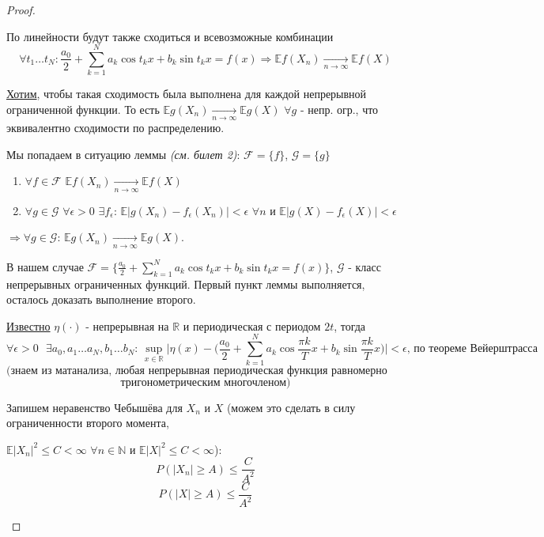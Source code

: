 \begin{proof}
\begin{itemize}
        По линейности будут также сходиться и всевозможные комбинации $$ \forall t_1 \ldots t_N: \frac{a_0}{2} + \sum_{k = 1}^{N} a_k\cos{t_kx} + b_k\sin{t_kx} = f(x) \Rightarrow \mathbb{E}f(X_n) \xrightarrow[n \rightarrow \infty]{} \mathbb{E}f(X) $$
        
        \underline{Хотим}, чтобы такая сходимость была выполнена для каждой непрерывной ограниченной функции. То есть $\mathbb{E}g(X_n) \xrightarrow[n \rightarrow \infty]{} \mathbb{E}g(X)$ $\forall g$ - непр. огр., что эквивалентно сходимости по распределению.
        
        Мы попадаем в ситуацию леммы \textit{(см. билет 2)}: $\mathcal{F} = \{f\}$, $\mathcal{G} = \{g\}$
        \begin{enumerate}
            \item $\forall f \in \mathcal{F}$ $\mathbb{E}f(X_n) \xrightarrow[n \rightarrow \infty]{} \mathbb{E}f(X)$
            \item $\forall g \in \mathcal{G}$ $\forall \epsilon > 0$ $\exists f_{\epsilon}$: $\mathbb{E}|g(X_n) - f_{\epsilon}(X_n)| < \epsilon$ $\forall n$ и $\mathbb{E}|g(X) - f_{\epsilon}(X)| < \epsilon$
        \end{enumerate}
        $\Rightarrow \forall g \in \mathcal{G}$: $\mathbb{E}g(X_n) \xrightarrow[n \rightarrow \infty]{} \mathbb{E}g(X)$.
        
        В нашем случае $\mathcal{F} = \Big\{ \frac{a_0}{2} + \sum_{k = 1}^{N} a_k\cos{t_kx} + b_k\sin{t_kx} = f(x) \Big\}$, $\mathcal{G}$ - класс непрерывных ограниченных функций. Первый пункт леммы выполняется, осталось доказать выполнение второго.
        
        \underline{Известно} $\eta(\cdot)$ - непрерывная на $\mathbb{R}$ и периодическая с периодом $2t$, тогда $$ \forall \epsilon > 0 \textrm{ } \exists a_0, a_1 \ldots a_N, b_1 \ldots b_N \textrm{: } \sup_{x \in \mathbb{R}}\Big|\eta(x) - \Big(\frac{a_0}{2} + \sum_{k = 1}^{N}a_k\cos{\frac{\pi k}{T}x} + b_k\sin{\frac{\pi k}{T}x} \Big) \Big| < \epsilon \textrm{, по теореме Вейерштрасса}$$ $$ \textrm{(знаем из матанализа, любая непрерывная периодическая функция равномерно приближается } $$ $$ \textrm{тригонометрическим многочленом)} $$
        
        Запишем неравенство Чебышёва для $X_n$ и $X$ (можем это сделать в силу ограниченности второго момента,
        
        $\mathbb{E}|X_n|^2 \leq C < \infty$ $\forall n \in \mathbb{N}$ и $\mathbb{E}|X|^2 \leq C < \infty$): $$ P(|X_n| \geq A) \leq \frac{C}{A^2} $$ $$ P(|X| \geq A) \leq \frac{C}{A^2} $$
        

\end{itemize}
\end{proof}
